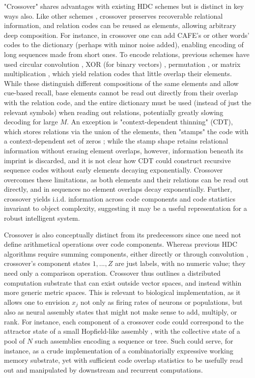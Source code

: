\documentclass{article}
\begin{document}
"Crossover" shares advantages with existing HDC schemes but is distinct in key ways also. Like other schemes \cite{Kanerva:2009}, crossover preserves recoverable relational information, and relation codes can be reused as elements, allowing arbitrary deep composition. For instance, in crossover one can add CAFE's or other words' codes to the dictionary (perhaps with minor noise added), enabling encoding of long sequences made from short ones. To encode relations, previous schemes have used circular convolution \cite{Plate:1995}, XOR (for binary vectors) \cite{Kanerva:1994}, permutation \cite{Sahlgren:2008, Gayler:1998}, or matrix multiplication \cite{Gosmann:2019}, which yield relation codes that little overlap their elements. While these distinguish different compositions of the same elements and allow cue-based recall, base elements cannot be read out directly from their overlap with the relation code, and the entire dictionary must be used (instead of just the relevant symbols) when reading out relations, potentially greatly slowing decoding for large $M$. An exception is "context-dependent thinning" (CDT), which stores relations via the union of the elements, then "stamps" the code with a context-dependent set of zeros \cite{Rachkovskij:2001}; while the stamp shape retains relational information without erasing element overlaps, however, information beneath its imprint is discarded, and it is not clear how CDT could construct recursive sequence codes without early elements decaying exponentially. Crossover overcomes these limitations, as both elements and their relations can be read out directly, and in sequences no element overlaps decay exponentially. Further, crossover yields i.i.d. information across code components and code statistics invariant to object complexity, suggesting it may be a useful representation for a robust intelligent system.

Crossover is also conceptually distinct from its predecessors since one need not define arithmetical operations over code components. Whereas previous HDC algorithms require summing components, either directly or through convolution \cite{Plate:1995, Gayler:1998, Sahlgren:2008, Gosmann:2019, Rachkovskij:2001, Kanerva:1994}, crossover's component states $1, ..., Z$ are just labels, with no numeric value; they need only a comparison operation. Crossover thus outlines a distributed computation substrate that can exist outside vector spaces, and instead within more generic metric spaces. This is relevant to biological implementation, as it allows one to envision $x_j$ not only as firing rates of neurons or populations, but also as neural assembly states that might not make sense to add, multiply, or rank. For instance, each component of a crossover code could correspond to the attractor state of a small Hopfield-like assembly \cite{Hopfield:1982}, with the collective state of a pool of $N$ such assemblies encoding a sequence or tree. Such could serve, for instance, as a crude implementation of a combinatorially expressive working memory substrate, yet with sufficient code overlap statistics to be usefully read out and manipulated by downstream and recurrent computations.
\end{document}
